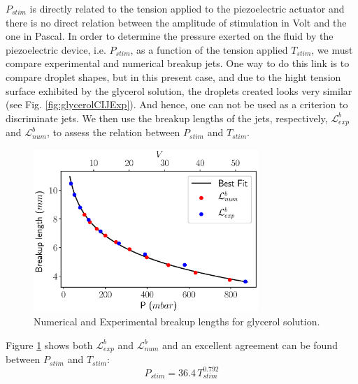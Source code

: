 \documentclass[twocolumn,10pt]{asme2ej}
\begin{document}
$P_{stim}$ is directly related to the tension applied to the piezoelectric actuator and there is no direct relation between the amplitude of stimulation in Volt and the one in Pascal. In order to determine the pressure exerted on the fluid by the piezoelectric device, i.e. $P_{stim}$, as a function of the tension applied $T_{stim}$, we must compare experimental and numerical breakup jets. One way to do this link is to compare droplet shapes, but in this present case, and due to the hight tension surface exhibited by the glycerol solution, the droplets created looks very similar (see Fig. \ref{fig:glycerolCIJExp}). And hence, one can not be used as a criterion to discriminate jets. We then use the breakup lengths of the jets, respectively, $\mathcal{L}_{exp}^b$ and $\mathcal{L}_{num}^b$, to assess the relation between $P_{stim}$ and $T_{stim}$. 

\begin{figure}[h]
    \centering
    \includegraphics[width=8.5cm]{LbGlycerol.eps}
    \caption{Numerical and Experimental breakup lengths for glycerol solution.}
    \label{fig:LbGlycerol}
\end{figure}

Figure \ref{fig:LbGlycerol} shows both $\mathcal{L}_{exp}^b$ and $\mathcal{L}_{num}^b$ and an excellent agreement can be found between $P_{stim}$ and $T_{stim}$:
\begin{equation}
    P_{stim} = 36.4 \, T_{stim}^{0.792}
\end{equation}
\end{document}
